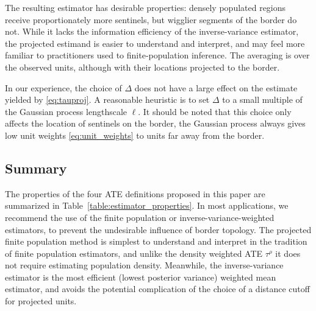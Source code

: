 \documentclass[letter,12pt]{article}
\newcommand{\taurho}{\tau^{\rho}}
\newcommand{\buffer}{\Delta}
\begin{document}
The resulting estimator has desirable properties: densely populated regions receive proportionately more sentinels, but wigglier segments of the border do not.
While it lacks the information efficiency of the inverse-variance estimator,
the projected estimand is easier to understand and interpret,
and may feel more familiar to practitioners used to finite-population inference.
The averaging is over the observed units, although with their locations projected to the border.

In our experience, the choice of \(\buffer\) does not have a large effect on the estimate yielded by \eqref{eq:tauproj}.
A reasonable heuristic is to set \(\buffer\) to a small multiple of the Gaussian process lengthscale \(\ell\).
It should be noted that this choice only affects the location of sentinels on the border, the Gaussian process always gives low unit weights \eqref{eq:unit_weights} to units far away from the border.

\hypertarget{ATE-summary}{%
\subsection{Summary}\label{sec:summary}}

The properties of the four ATE definitions proposed in this paper are summarized in Table~\ref{table:estimator_properties}.
In most applications, we recommend the use of the finite population or inverse-variance-weighted estimators, to prevent the undesirable influence of border topology.
The projected finite population method is simplest to understand and interpret in the tradition of finite population estimators, and unlike the density weighted ATE \(\taurho\) it does not require estimating population density.
Meanwhile, the inverse-variance estimator is the most efficient (lowest posterior variance) weighted mean estimator,
and avoids the potential complication of the choice of a distance cutoff for projected units.
\end{document}
